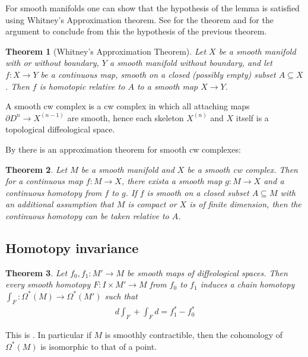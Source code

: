 \documentclass{scrartcl}
\theoremstyle{plain}
\newtheorem{theorem}{Theorem}[section]
\theoremstyle{definition}
\renewcommand{\subset}{\subseteq}
\begin{document}
For smooth manifolds one can show that the hypothesis of the lemma is satisfied using Whitney's Approximation theorem. See \cite[Theorem 6.26]{lee2003introduction} for the theorem and \cite{parkproof} for the argument to conclude from this the hypothesis of the previous theorem.

\begin{theorem}[Whitney's Approximation Theorem]
    Let $X$ be a smooth manifold with or without boundary, $Y$ a smooth manifold without boundary, and let $f\colon X\to Y$ be a continuous map, smooth on a closed (possibly empty) subset $A\subset X$. Then $f$ is homotopic relative to $A$ to a smooth map $X\to Y$.
\end{theorem}

A smooth cw complex is a cw complex in which all attaching maps $\partial D^n\to X^{(n-1)}$ are smooth, hence each skeleton $X^{(n)}$ and $X$ itself is a topological diffeological space.

By \cite{iwase2020whitney} there is an approximation theorem for smooth cw complexes:
\begin{theorem}
    Let $M$ be a smooth manifold and $X$ be a smooth cw complex. Then for a continuous map $f\colon M\to X$, there exista a smooth map $g\colon M\to X$ and a continuous homotopy from $f$ to $g$. If $f$ is smooth on a closed subset $A\subset M$ with an additional assumption that $M$ is compact or $X$ is of finite dimension, then the continuous homotopy can be taken relative to $A$. 
\end{theorem}

\subsection{Homotopy invariance}
\begin{theorem}
    Let $f_0, f_1\colon M'\to M$ be smooth maps of diffeological spaces. Then every smooth homotopy $F\colon I\times M'\to M$ from $f_0$ to $f_1$ induces a chain homotopy $\int_F\colon \Omega^*(M)\to \Omega^*(M')$ such that 
    \begin{align*}
        d\int_F + \int_F d = f_1^* - f_0^*
    \end{align*}
\end{theorem}
This is \cite[Lemma 1.4.1]{chen1977iterated}. In particular if $M$ is smoothly contractible, then the cohomology of $\Omega^*(M)$ is isomorphic to that of a point.

\end{document}
